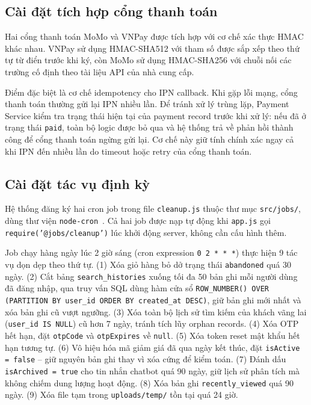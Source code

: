 \subsection{Cài đặt tích hợp cổng thanh toán}

Hai cổng thanh toán MoMo và VNPay được tích hợp với cơ chế xác thực HMAC khác nhau. VNPay sử dụng HMAC-SHA512 với tham số được sắp xếp theo thứ tự từ điển trước khi ký, còn MoMo sử dụng HMAC-SHA256 với chuỗi nối các trường cố định theo tài liệu API của nhà cung cấp.

Điểm đặc biệt là cơ chế idempotency cho IPN callback. Khi gặp lỗi mạng, cổng thanh toán thường gửi lại IPN nhiều lần. Để tránh xử lý trùng lặp, Payment Service kiểm tra trạng thái hiện tại của payment record trước khi xử lý: nếu đã ở trạng thái \texttt{paid}, toàn bộ logic được bỏ qua và hệ thống trả về phản hồi thành công để cổng thanh toán ngừng gửi lại. Cơ chế này giữ tính chính xác ngay cả khi IPN đến nhiều lần do timeout hoặc retry của cổng thanh toán.

\subsection{Cài đặt tác vụ định kỳ}
\label{sec:c4_cron_jobs}

Hệ thống đăng ký hai cron job trong file \texttt{cleanup.js} thuộc thư mục \texttt{src/jobs/}, dùng thư viện \texttt{node-cron}~\cite{node_cron_docs}. Cả hai job được nạp tự động khi \texttt{app.js} gọi \texttt{require('@jobs/cleanup')} lúc khởi động server, không cần cấu hình thêm.

Job chạy hàng ngày lúc 2 giờ sáng (cron expression \texttt{0 2 * * *}) thực hiện 9 tác vụ dọn dẹp theo thứ tự. (1) Xóa giỏ hàng bỏ dở trạng thái \texttt{abandoned} quá 30 ngày. (2) Cắt bảng \texttt{search\_histories} xuống tối đa 50 bản ghi mỗi người dùng đã đăng nhập, qua truy vấn SQL dùng hàm cửa sổ \texttt{ROW\_NUMBER() OVER (PARTITION BY user\_id ORDER BY created\_at DESC)}, giữ bản ghi mới nhất và xóa bản ghi cũ vượt ngưỡng. (3) Xóa toàn bộ lịch sử tìm kiếm của khách vãng lai (\texttt{user\_id IS NULL}) cũ hơn 7 ngày, tránh tích lũy orphan records. (4) Xóa OTP hết hạn, đặt \texttt{otpCode} và \texttt{otpExpires} về \texttt{null}. (5) Xóa token reset mật khẩu hết hạn tương tự. (6) Vô hiệu hóa mã giảm giá đã qua ngày kết thúc, đặt \texttt{isActive = false} -- giữ nguyên bản ghi thay vì xóa cứng để kiểm toán. (7) Đánh dấu \texttt{isArchived = true} cho tin nhắn chatbot quá 90 ngày, giữ lịch sử phân tích mà không chiếm dung lượng hoạt động. (8) Xóa bản ghi \texttt{recently\_viewed} quá 90 ngày. (9) Xóa file tạm trong \texttt{uploads/temp/} tồn tại quá 24 giờ.

